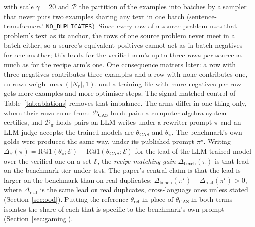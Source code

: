 with scale $\gamma = 20$ and $\mathcal{P}$ the partition of the examples into batches by a sampler that never puts two examples sharing any text in one batch (sentence-transformers' \texttt{NO\_DUPLICATES}). Since every row of a source problem uses that problem's text as its anchor, the rows of one source problem never meet in a batch either, so a source's equivalent positives cannot act as in-batch negatives for one another; this holds for the verified arm's up to three rows per source as much as for the recipe arm's one. One consequence matters later: a row with three negatives contributes three examples and a row with none contributes one, so rows weigh $\max(|N_r|,1)$, and a training file with more negatives per row gets more examples and more optimiser steps. The signal-matched control of Table~\ref{tab:ablations} removes that imbalance. The arms differ in one thing only, where their rows come from: $\mathcal{D}_{\mathrm{CAS}}$ holds pairs a computer algebra system certifies, and $\mathcal{D}_{\pi}$ holds pairs an LLM writes under a rewriter prompt $\pi$ and an LLM judge accepts; the trained models are $\theta_{\mathrm{CAS}}$ and $\theta_{\pi}$. The benchmark's own golds were produced the same way, under its published prompt $\pi^{\star}$. Writing $\Delta_{\mathcal{E}}(\pi) = \mathrm{R}@1(\theta_\pi;\mathcal{E}) - \mathrm{R}@1(\theta_{\mathrm{CAS}};\mathcal{E})$ for the lead of the LLM-trained model over the verified one on a set $\mathcal{E}$, the \emph{recipe-matching gain} $\Delta_{\mathrm{bench}}(\pi)$ is that lead on the benchmark tier under test. The paper's central claim is that the lead is larger on the benchmark than on real duplicates: $\Delta_{\mathrm{bench}}(\pi^{\star}) - \Delta_{\mathrm{real}}(\pi^{\star}) > 0$, where $\Delta_{\mathrm{real}}$ is the same lead on real duplicates, cross-language ones unless stated (Section~\ref{sec:ood}). Putting the reference $\theta_{\mathrm{ref}}$ in place of $\theta_{\mathrm{CAS}}$ in both terms isolates the share of each that is specific to the benchmark's own prompt (Section~\ref{sec:gaming}).

